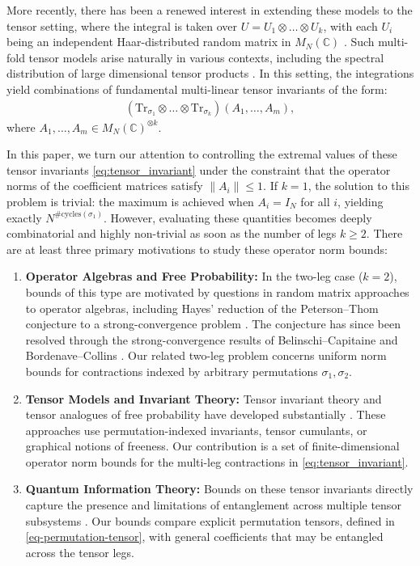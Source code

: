 \documentclass[12pt]{article}
\numberwithin{equation}{section}
\theoremstyle{plain}
\def\bC{\mathbb C}
\def\Tr{\mathrm {Tr}}
\begin{document}
More recently, there has been a renewed interest in extending these models to the tensor setting, where the integral is taken over $U = U_1 \otimes \dots \otimes U_k$, with each $U_i$ being an independent Haar-distributed random matrix in $M_N(\bC)$ \cite{MR4735823}. Such multi-fold tensor models arise naturally in various contexts, including the spectral distribution of large dimensional tensor products \cite{MR4460273}. In this setting, the integrations yield combinations of fundamental multi-linear tensor invariants of the form:
\begin{align} \label{eq:tensor_invariant}
    (\Tr_{\sigma_1} \otimes \ldots \otimes \Tr_{\sigma_k} ) ( A_1, \ldots, A_m ),
\end{align}
where $A_1, \ldots, A_m \in M_N(\bC)^{\otimes k}$.

In this paper, we turn our attention to controlling the extremal values of these tensor invariants \eqref{eq:tensor_invariant} under the constraint that the operator norms of the coefficient matrices satisfy $\|A_i\| \le 1$. If $k=1$, the solution to this problem is trivial: the maximum is achieved when $A_i = I_N$ for all $i$, yielding exactly $N^{\# \text{cycles}(\sigma_1)}$. However, evaluating these quantities becomes deeply combinatorial and highly non-trivial as soon as the number of legs $k \ge 2$. There are at least three primary motivations to study these operator norm bounds:

\begin{enumerate}
    \item \textbf{Operator Algebras and Free Probability:} In the two-leg case ($k=2$), bounds of this type are motivated by questions in random matrix approaches to operator algebras, including Hayes' reduction of the Peterson--Thom conjecture to a strong-convergence problem \cite{MR4448584}. The conjecture has since been resolved through the strong-convergence results of Belinschi--Capitaine and Bordenave--Collins \cite{BelinschiCapitaine2022,BordenaveCollins2023}. Our related two-leg problem concerns uniform norm bounds for contractions indexed by arbitrary permutations $\sigma_1,\sigma_2$.
    \item \textbf{Tensor Models and Invariant Theory:} Tensor invariant theory and tensor analogues of free probability have developed substantially \cite{MR4735823,MR4604905,CGL2024,BonninBordenave2024,NechitaPark2025}. These approaches use permutation-indexed invariants, tensor cumulants, or graphical notions of freeness. Our contribution is a set of finite-dimensional operator norm bounds for the multi-leg contractions in \eqref{eq:tensor_invariant}.
    \item \textbf{Quantum Information Theory:} Bounds on these tensor invariants directly capture the presence and limitations of entanglement across multiple tensor subsystems \mbox{\cite{CN2010,MR4604905}}. Our bounds compare explicit permutation tensors, defined in \eqref{eq-permutation-tensor}, with general coefficients that may be entangled across the tensor legs.
\end{enumerate}
\end{document}
